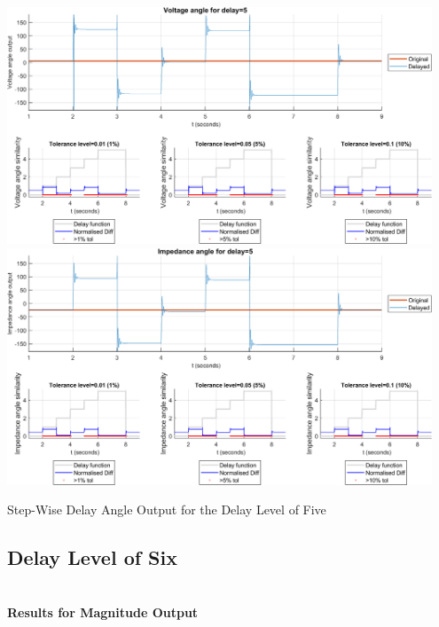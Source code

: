 \begin{floatingfigure}[p]{\textwidth}
    \includegraphics[width=0.95\textwidth]{PMUsim-figures/DelayOf_5/Step_vAngle.png}    
    \includegraphics[width=0.95\textwidth]{PMUsim-figures/DelayOf_5/Step_iAngle.png}    
    \label{fig:PMUsimStep_Five_Angle}
    \caption{Step-Wise Delay Angle Output for the Delay Level of Five}
\end{floatingfigure}



\newpage \subsection{Delay Level of Six} \\ 
\textbf{Results for Magnitude Output}

